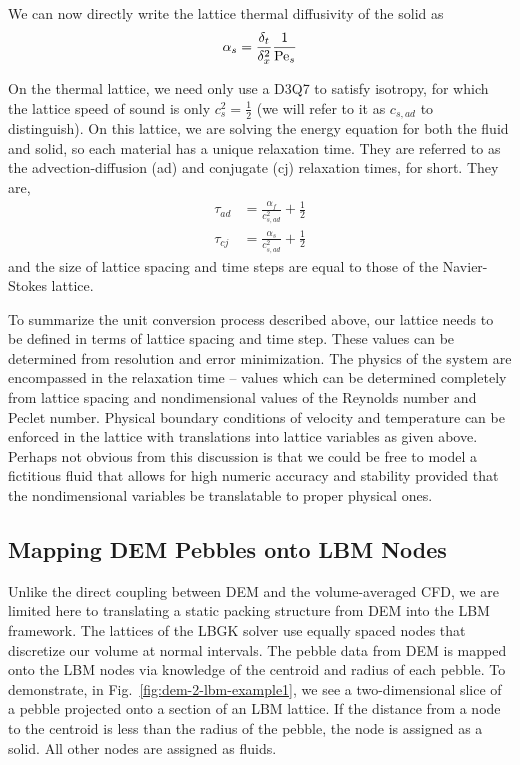 We can now directly write the lattice thermal diffusivity of the solid as
\begin{equation}
	\alpha_s = \frac{\delta_t}{\delta_x^2}\frac{1}{\mathrm{Pe}_s}
\end{equation}

On the thermal lattice, we need only use a D3Q7 to satisfy isotropy, for which the lattice speed of sound is only $c_s^2 = \frac{1}{2}$ (we will refer to it as $c_{s,ad}$ to distinguish). On this lattice, we are solving the energy equation for both the fluid and solid, so each material has a unique relaxation time. They are referred to as the advection-diffusion (ad) and conjugate (cj) relaxation times, for short. They are,
\begin{subequations}
\begin{align}
	\tau_{ad} &= \frac{\alpha_f}{c_{s,ad}^2} + \frac{1}{2} \\
	\tau_{cj} &= \frac{\alpha_s}{c_{s,ad}^2} + \frac{1}{2}
\end{align}
\end{subequations}
and the size of lattice spacing and time steps are equal to those of the Navier-Stokes lattice.

To summarize the unit conversion process described above, our lattice needs to be defined in terms of lattice spacing and time step. These values can be determined from resolution and error minimization. The physics of the system are encompassed in the relaxation time -- values which can be determined completely from lattice spacing and nondimensional values of the Reynolds number and Peclet number. Physical boundary conditions of velocity and temperature can be enforced in the lattice with translations into lattice variables as given above. Perhaps not obvious from this discussion is that we could be free to model a fictitious fluid that allows for high numeric accuracy and stability provided that the nondimensional variables be translatable to proper physical ones.




\subsection{Mapping DEM Pebbles onto LBM Nodes}\label{sec:dem2lbm-mapping}

Unlike the direct coupling between DEM and the volume-averaged CFD, we are limited here to translating a static packing structure from DEM into the LBM framework. The lattices of the LBGK solver use equally spaced nodes that discretize our volume at normal intervals. The pebble data from DEM is mapped onto the LBM nodes via knowledge of the centroid and radius of each pebble. To demonstrate, in Fig.~\ref{fig:dem-2-lbm-example1}, we see a two-dimensional slice of a pebble projected onto a section of an LBM lattice. If the distance from a node to the centroid is less than the radius of the pebble, the node is assigned as a solid. All other nodes are assigned as fluids.

